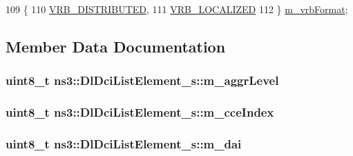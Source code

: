 \begin{DoxyCode}
109   \{
110     \hyperlink{structns3_1_1DlDciListElement__s_a5386f2af7d6d283f6f885267f4b5a110a014194696078506aabe3884243b76178}{VRB\_DISTRIBUTED},
111     \hyperlink{structns3_1_1DlDciListElement__s_a5386f2af7d6d283f6f885267f4b5a110aca59c75a0c251ddb63bf518df2fe5061}{VRB\_LOCALIZED}
112   \} \hyperlink{structns3_1_1DlDciListElement__s_a0a331933f4b624878224b003c786a606}{m\_vrbFormat};
\end{DoxyCode}


\subsection{Member Data Documentation}
\subsubsection[{\texorpdfstring{m\+\_\+aggr\+Level}{m_aggrLevel}}]{\setlength{\rightskip}{0pt plus 5cm}uint8\+\_\+t ns3\+::\+Dl\+Dci\+List\+Element\+\_\+s\+::m\+\_\+aggr\+Level}\hypertarget{structns3_1_1DlDciListElement__s_a88548756c98a182b9803e66ef79a5c93}{}\label{structns3_1_1DlDciListElement__s_a88548756c98a182b9803e66ef79a5c93}
\subsubsection[{\texorpdfstring{m\+\_\+cce\+Index}{m_cceIndex}}]{\setlength{\rightskip}{0pt plus 5cm}uint8\+\_\+t ns3\+::\+Dl\+Dci\+List\+Element\+\_\+s\+::m\+\_\+cce\+Index}\hypertarget{structns3_1_1DlDciListElement__s_a0431897f8316445c2959d28c54aa8613}{}\label{structns3_1_1DlDciListElement__s_a0431897f8316445c2959d28c54aa8613}
\subsubsection[{\texorpdfstring{m\+\_\+dai}{m_dai}}]{\setlength{\rightskip}{0pt plus 5cm}uint8\+\_\+t ns3\+::\+Dl\+Dci\+List\+Element\+\_\+s\+::m\+\_\+dai}\hypertarget{structns3_1_1DlDciListElement__s_a15a6e1e2ac18cd6c5d5a2d147da1dbe1}{}\label{structns3_1_1DlDciListElement__s_a15a6e1e2ac18cd6c5d5a2d147da1dbe1}

